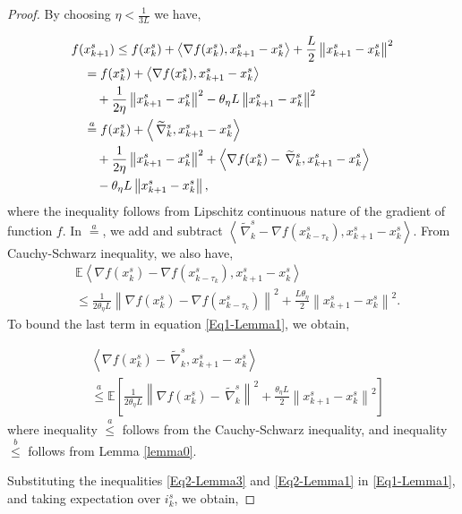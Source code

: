 \documentclass{article}
\newcommand*{\E}{\mathbb{E}}
\newcommand*{\VRG}{\,\widetilde{\nabla}_k^s}
\newcommand{\norm}[1]{\left\lVert#1\right\rVert}
\newcommand{\Iprod}[2]{\left\langle #1,#2\right\rangle}
\theoremstyle{definition}
\theoremstyle{remark}
\begin{document}
\begin{proof}
By choosing $\eta < \frac{1}{3L}$ we have,

\begin{gather}
\label{Eq1-Lemma1}
\begin{split}
f(&x_{k+1}^s)  \leq f(x_{k}^s) + \Iprod{\nabla f(x_{k}^s)}{x_{k+1}^s-x_{k}^s}+\frac{L}{2}\norm{x_{k+1}^s-x_{k}^s}^2\\
&=f(x_{k}^s) + \Iprod{\nabla f(x_{k}^s)}{x_{k+1}^s-x_{k}^s}\\
&~~~+ {\frac{1 }{2\eta}}\norm{x_{k+1}^s-x_{k}^s}^2-{\theta_{\eta} L}\norm{x_{k+1}^s-x_{k}^s}^2\\
&\stackrel{a}{=}f(x_{k}^s) + \Iprod{\VRG}{x_{k+1}^s-x_{k}^s}\\
&~~~+ { \frac{1}{2\eta}}\norm{x_{k+1}^s-x_{k}^s}^2+\Iprod{\nabla f(x_{k}^s)-\VRG}{x_{k+1}^s-x_{k}^s}\\
&~~~-{\theta_{\eta} L}\norm{x_{k+1}^s-x_{k}^s},
\end{split}
\raisetag{15pt}
\end{gather}
where the inequality follows from Lipschitz continuous nature of the gradient of function $f$. In $\stackrel{a}{=}$, we add and subtract $\Iprod{\VRG-\nabla f(x_{k-\tau_k}^s)}{x_{k+1}^s-x_{k}^s}$. From Cauchy-Schwarz inequality, we also have,
\begin{equation}\label{Eq2-Lemma3}
\begin{split}
& \E\Iprod{\nabla f(x_{k}^s)-\nabla f(x_{k-\tau_k}^s)}{x_{k+1}^s-x_{k}^s}\\
&\leq \frac{1}{2 \theta_{\eta} L} \norm{\nabla f(x_{k}^s)-\nabla f(x_{k-\tau_k}^s)}^2+ \frac{L\theta_{\eta}}{2}\norm{x_{k+1}^s-x_{k}^s}^2.
\end{split}
\end{equation}
To bound the last term in equation \eqref{Eq1-Lemma1}, we obtain,

\begin{equation}\label{Eq2-Lemma1}
\begin{split}
&\Iprod{\nabla f(x_{k}^s)-\VRG}{x_{k+1}^s-x_{k}^s}\\
&\stackrel{a}{\leq} \E\left[\frac{1}{2\theta_{\eta} L}\norm{\nabla f(x_{k}^s)-\VRG}^2 + \frac{\theta_{\eta} L}{2}\norm{x_{k+1}^s-x_{k}^s}^2\right]
\end{split}
\end{equation}
where inequality $\stackrel{a}{\leq}$ follows from the Cauchy-Schwarz inequality, and inequality $\stackrel{b}{\leq}$ follows from Lemma \ref{lemma0}. 

Substituting the inequalities \eqref{Eq2-Lemma3} and \eqref{Eq2-Lemma1} in \eqref{Eq1-Lemma1}, and taking expectation over $i ^s_k$, we obtain,


\end{proof}
\end{document}
